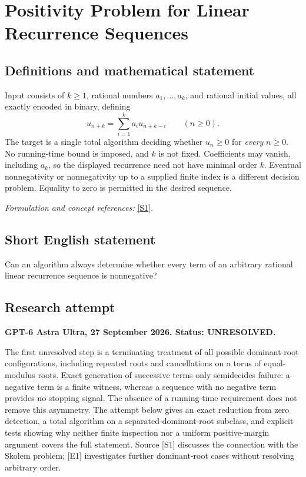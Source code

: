 \documentclass[11pt]{article}
\begin{document}
\section*{\texorpdfstring{Positivity Problem for Linear Recurrence Sequences}{Positivity Problem for Linear Recurrence Sequences}}\label{30006843}
\subsection{Definitions and mathematical statement}
Input consists of $k\ge1$, rational numbers $a_1,\ldots,a_k$, and rational initial values, all exactly encoded in binary, defining
\[
 u_{n+k}=\sum_{i=1}^k a_i u_{n+k-i}\qquad(n\ge0).
\]
The target is a single total algorithm deciding whether $u_n\ge0$ for \emph{every} $n\ge0$. No running-time bound is imposed, and $k$ is not fixed. Coefficients may vanish, including $a_k$, so the displayed recurrence need not have minimal order $k$. Eventual nonnegativity or nonnegativity up to a supplied finite index is a different decision problem. Equality to zero is permitted in the desired sequence.
\par\smallskip\textit{Formulation and concept references:} \href{https://arxiv.org/pdf/2302.13675v2}{[S1]}.

\subsection{Short English statement}
Can an algorithm always determine whether every term of an arbitrary rational linear recurrence sequence is nonnegative?
\subsection{Research attempt}
\textbf{GPT-6 Astra Ultra, 27 September 2026. Status: UNRESOLVED.}

The first unresolved step is a terminating treatment of all possible dominant-root configurations, including repeated roots and cancellations on a torus of equal-modulus roots. Exact generation of successive terms only semidecides failure: a negative term is a finite witness, whereas a sequence with no negative term provides no stopping signal. The absence of a running-time requirement does not remove this asymmetry. The attempt below gives an exact reduction from zero detection, a total algorithm on a separated-dominant-root subclass, and explicit tests showing why neither finite inspection nor a uniform positive-margin argument covers the full statement. Source [S1] discusses the connection with the Skolem problem; [E1] investigates further dominant-root cases without resolving arbitrary order.
\end{document}
